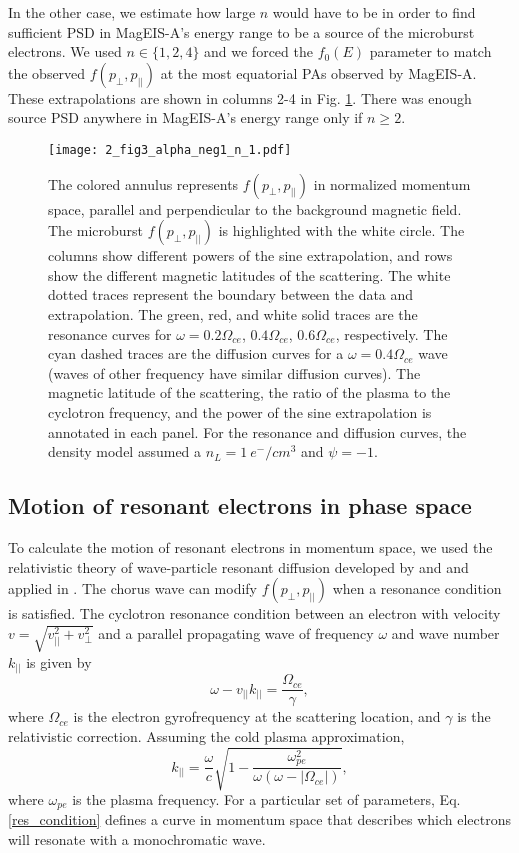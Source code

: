 In the other case, we estimate how large $n$ would have to be in order to find sufficient PSD in MagEIS-A's energy range to be a source of the microburst electrons. We used $n \in \{1, 2, 4\}$ and we forced the $f_0(E)$ parameter to match the observed $f(p_\perp, p_{||})$ at the most equatorial PAs observed by MagEIS-A. These extrapolations are shown in columns 2-4 in Fig. \ref{fig3}. There was enough source PSD anywhere in MagEIS-A's energy range only if $n \geq 2$.

\begin{figure}
\texttt{[image: 2\_fig3\_alpha\_neg1\_n\_1.pdf]}
\caption{The colored annulus represents $f(p_\perp, p_{||})$ in normalized momentum space, parallel and perpendicular to the background magnetic field. The microburst $f(p_\perp, p_{||})$ is highlighted with the white circle. The columns show different powers of the sine extrapolation, and rows show the different magnetic latitudes of the scattering. The white dotted traces represent the boundary between the data and extrapolation. The green, red, and white solid traces are the resonance curves for $\omega = 0.2 \Omega_{ce}$, $0.4 \Omega_{ce}$, $0.6 \Omega_{ce}$, respectively. The cyan dashed traces are the diffusion curves for a $\omega = 0.4 \Omega_{ce}$ wave (waves of other frequency have similar diffusion curves). The magnetic latitude of the scattering, the ratio of the plasma to the cyclotron frequency, and the power of the sine extrapolation is annotated in each panel. For the resonance and diffusion curves, the density model assumed a $n_L = 1 \ e^-/cm^3$ and $\psi = -1$.}
\label{fig3}
\end{figure}

\subsection{Motion of resonant electrons in phase space}\label{diffusion_derivation}
To calculate the motion of resonant electrons in momentum space, we used the relativistic theory of wave-particle resonant diffusion developed by \citet{Walker1993} and \citet{Summers1998} and applied in \citet{Meredith2002}. The chorus wave can modify $f(p_\perp, p_{||})$ when a resonance condition is satisfied. The cyclotron resonance condition between an electron with velocity $v = \sqrt{v_{||}^2 + v_{\perp}^2}$ and a parallel propagating wave of frequency $\omega$ and wave number $k_{||}$ is given by
\begin{equation}
\omega - v_{||} k_{||} = \frac{\Omega_{ce}}{\gamma},
\label{res_condition}
\end{equation} where $\Omega_{ce}$ is the electron gyrofrequency at the scattering location, and $\gamma$ is the relativistic correction. Assuming the cold plasma approximation,
\begin{equation}
k_{||} = \frac{\omega}{c} \sqrt{1 - \frac{\omega_{pe}^2}{\omega (\omega - |\Omega_{ce}|)}},
\end{equation} where $\omega_{pe}$ is the plasma frequency. For a particular set of parameters, Eq. \ref{res_condition} defines a curve in momentum space that describes which electrons will resonate with a monochromatic wave.

